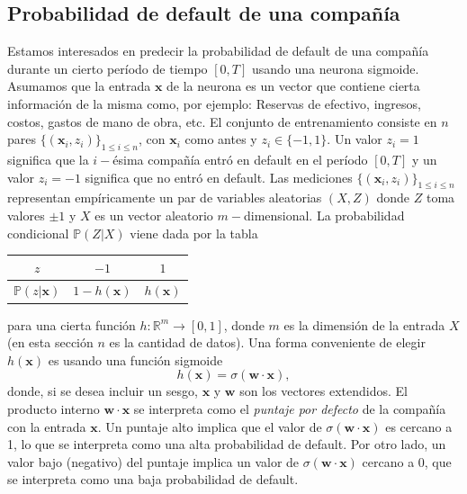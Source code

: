\documentclass[12pt, a4paper]{amsbook}
\newcommand{\R}{{\mathbb R}}
\renewcommand{\P}{{\mathbb P}}
\newcommand{\ww}{{\mathbf w}}
\newcommand{\xx}{{\mathbf x}}
\theoremstyle{remark}
\theoremstyle{definition}
\numberwithin{section}{chapter}
\numberwithin{subsection}{section}
\numberwithin{equation}{section}
\numberwithin{figure}{chapter}
\begin{document}
\subsection{Probabilidad de default de una compañía}
Estamos interesados en predecir la probabilidad de default de una compañía durante un cierto período de tiempo $[0, T]$ usando una neurona sigmoide. Asumamos que la entrada $\xx$ de la neurona es un vector que contiene cierta información de la misma como, por ejemplo: Reservas de efectivo, ingresos, costos, gastos de mano de obra, etc. El conjunto de entrenamiento consiste en $n$ pares $\{(\xx_i, z_i)\}_{1\le i\le n}$, con $\xx_i$ como antes y $z_i\in \{-1,1\}$. Un valor $z_i=1$ significa que la $i-$ésima compañía entró en default en el período $[0,T]$ y un valor $z_i=-1$ significa que no entró en default. Las mediciones $\{(\xx_i, z_i)\}_{1\le i\le n}$ representan empíricamente un par de variables aleatorias $(X, Z)$ donde $Z$ toma valores $\pm1$ y $X$ es un vector aleatorio $m-$dimensional. La probabilidad condicional $\P(Z|X)$ viene dada por la tabla
\begin{center}
\begin{tabular}{|c|c|c|}
\hline
$z$ & $-1$ & $1$\\ \hline
$\P(z|\xx)$ & $1-h(\xx)$ & $h(\xx)$ \\ \hline
\end{tabular}
\end{center}
para una cierta función $h\colon \R^m\to [0,1]$, donde $m$ es la dimensión de la entrada $X$ (en esta sección $n$ es la cantidad de datos). Una forma conveniente de elegir $h(\xx)$ es usando una función sigmoide
$$
h(\xx) = \sigma(\ww\cdot\xx),
$$
donde, si se desea incluir un sesgo, $\xx$ y $\ww$ son los vectores extendidos.
El producto interno $\ww\cdot\xx$ se interpreta como el {\em puntaje por defecto} de la compañía con la entrada $\xx$. Un puntaje alto implica que el valor de $\sigma(\ww\cdot\xx)$ es cercano a 1, lo que se interpreta como una alta probabilidad de default. Por otro lado, un valor bajo (negativo) del puntaje implica un valor de $\sigma(\ww\cdot\xx)$ cercano a 0, que se interpreta como una baja probabilidad de default.
\end{document}
